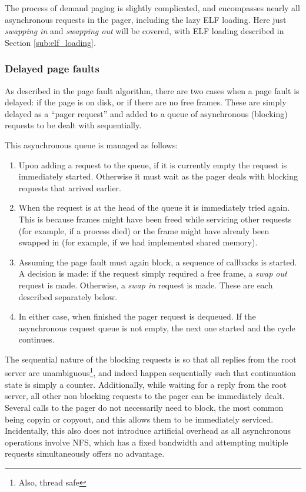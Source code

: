 \documentclass[12pt,english]{article}
\begin{document}
The process of demand paging is slightly complicated, and encompasses nearly all asynchronous requests in the pager, including the lazy ELF loading.  Here just \emph{swapping in} and \emph{swapping out} will be covered, with ELF loading described in Section \ref{sub:elf_loading}.

\subsubsection{Delayed page faults}

As described in the page fault algorithm, there are two cases when a page fault is delayed: if the page is on disk, or if there are no free frames.  These are simply delayed as a ``pager request'' and added to a queue of asynchronous (blocking) requests to be dealt with sequentially.

This asynchronous queue is managed as follows:
\begin{enumerate}
\item Upon adding a request to the queue, if it is currently empty the request is immediately started.  Otherwise it must wait as the pager deals with blocking requests that arrived earlier.
\item When the request is at the head of the queue it is immediately tried again.  This is because frames might have been freed while servicing other requests (for example, if a process died) or the frame might have already been swapped in (for example, if we had implemented shared memory).
\item Assuming the page fault must again block, a sequence of callbacks is started.  A decision is made: if the request simply required a free frame, a \emph{swap out} request is made.  Otherwise, a \emph{swap in} request is made.  These are each described separately below.
\item In either case, when finished the pager request is dequeued.  If the asynchronous request queue is not empty, the next one started and the cycle continues.
\end{enumerate}

The sequential nature of the blocking requests is so that all replies from the root server are unambiguous\footnote{Also, thread safe}, and indeed happen sequentially such that continuation state is simply a counter.  Additionally, while waiting for a reply from the root server, all other non blocking requests to the pager can be immediately dealt.  Several calls to the pager do not necessarily need to block, the most common being copyin or copyout, and this allows them to be immediately serviced.  Incidentally, this also does not introduce artificial overhead as all asynchronous operations involve NFS, which has a fixed bandwidth and attempting multiple requests simultaneously offers no advantage.
\end{document}
